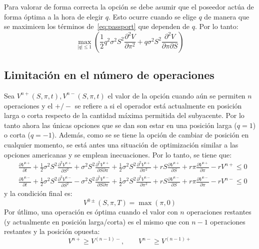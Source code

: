 Para valorar de forma correcta la opción se debe asumir que el poseedor actúa de forma óptima a la hora de elegir $q$. Esto ocurre cuando se elige $q$ de manera que se maximicen los términos de~\eqref{eq:passport} que dependen de $q$. Por lo tanto:
\begin{equation*}
    \boxed{\max_{|q|\leq 1} \left( \frac{1}{2}q^2\sigma^2 S^2 \frac{\partial^2 V}{\partial \pi^2} + q\sigma^2 S^2 \frac{\partial^2 V}{\partial \pi \partial S} \right)}
\end{equation*}





\subsection{Limitación en el número de operaciones}
Sea $V^{n+}(S,\pi,t), V^{n-}(S,\pi,t)$ el valor de la opción cuando aún se permiten $n$ operaciones y el $+/-$ se refiere a si el operador está actualmente en posición larga o corta respecto de la cantidad máxima permitida del subyacente. Por lo tanto ahora las únicas opciones que se dan son estar en una posición larga ($q=1$) o corta ($q=-1$). Además, como se se tiene la opción de cambiar de posición en cualquier momento, se está antes una situación de optimización similar a las opciones americanas y se emplean inecuaciones. Por lo tanto, se tiene que:
\begin{align*}
    &\boxed{\frac{\partial V^{n+}}{\partial t} + \frac{1}{2}\sigma^2 S^2 \frac{\partial^2 V^{n+}}{\partial S^2} + \sigma^2 S^2 \frac{\partial^2 V^{n+}}{\partial S \partial \pi} + \frac{1}{2}\sigma^2 S^2 \frac{\partial^2 V^{n+}}{\partial \pi^2} + rS\frac{\partial V^{n+}}{\partial S} + r\pi\frac{\partial V^{n+}}{\partial \pi} - rV^{n+} \leq 0} \\[1.5em]
    &\boxed{\frac{\partial V^{n-}}{\partial t} + \frac{1}{2}\sigma^2 S^2 \frac{\partial^2 V^{n-}}{\partial S^2} - \sigma^2 S^2 \frac{\partial^2 V^{n-}}{\partial S \partial \pi} + \frac{1}{2}\sigma^2 S^2 \frac{\partial^2 V^{n-}}{\partial \pi^2} + rS\frac{\partial V^{n-}}{\partial S} + r\pi\frac{\partial V^{n-}}{\partial \pi} - rV^{n-} \leq 0}
\end{align*}
y la condición final es:
\begin{equation*}
    \boxed{V^{0\pm}(S,\pi,T) = \max(\pi,0)}
\end{equation*}
Por útlimo, una operación es óptima cuando el valor con $n$ operaciones restantes (y actualmente en posición larga/corta) es el mismo que con $n-1$ operaciones restantes y la posición opuesta:
\begin{equation*}
    \boxed{V^{n+} \geq V^{(n-1)-}, \qquad V^{n-} \geq V^{(n-1)+}}
\end{equation*}

